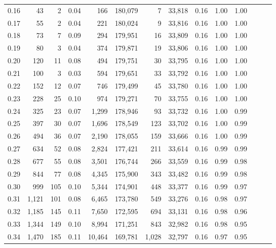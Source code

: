 \begin{tabular}{rrrrrrrrrrrrrr}
0.16 &     43 &      2 &  0.04 &      166 &  180,079 &       7 &  33,818 &  0.16 &  1.00 &      1.00 \\
0.17 &     55 &      2 &  0.04 &      221 &  180,024 &       9 &  33,816 &  0.16 &  1.00 &      1.00 \\
0.18 &     73 &      7 &  0.09 &      294 &  179,951 &      16 &  33,809 &  0.16 &  1.00 &      1.00 \\
0.19 &     80 &      3 &  0.04 &      374 &  179,871 &      19 &  33,806 &  0.16 &  1.00 &      1.00 \\
0.20 &    120 &     11 &  0.08 &      494 &  179,751 &      30 &  33,795 &  0.16 &  1.00 &      1.00 \\
0.21 &    100 &      3 &  0.03 &      594 &  179,651 &      33 &  33,792 &  0.16 &  1.00 &      1.00 \\
0.22 &    152 &     12 &  0.07 &      746 &  179,499 &      45 &  33,780 &  0.16 &  1.00 &      1.00 \\
0.23 &    228 &     25 &  0.10 &      974 &  179,271 &      70 &  33,755 &  0.16 &  1.00 &      1.00 \\
0.24 &    325 &     23 &  0.07 &    1,299 &  178,946 &      93 &  33,732 &  0.16 &  1.00 &      0.99 \\
0.25 &    397 &     30 &  0.07 &    1,696 &  178,549 &     123 &  33,702 &  0.16 &  1.00 &      0.99 \\
0.26 &    494 &     36 &  0.07 &    2,190 &  178,055 &     159 &  33,666 &  0.16 &  1.00 &      0.99 \\
0.27 &    634 &     52 &  0.08 &    2,824 &  177,421 &     211 &  33,614 &  0.16 &  0.99 &      0.99 \\
0.28 &    677 &     55 &  0.08 &    3,501 &  176,744 &     266 &  33,559 &  0.16 &  0.99 &      0.98 \\
0.29 &    844 &     77 &  0.08 &    4,345 &  175,900 &     343 &  33,482 &  0.16 &  0.99 &      0.98 \\
0.30 &    999 &    105 &  0.10 &    5,344 &  174,901 &     448 &  33,377 &  0.16 &  0.99 &      0.97 \\
0.31 &  1,121 &    101 &  0.08 &    6,465 &  173,780 &     549 &  33,276 &  0.16 &  0.98 &      0.97 \\
0.32 &  1,185 &    145 &  0.11 &    7,650 &  172,595 &     694 &  33,131 &  0.16 &  0.98 &      0.96 \\
0.33 &  1,344 &    149 &  0.10 &    8,994 &  171,251 &     843 &  32,982 &  0.16 &  0.98 &      0.95 \\
0.34 &  1,470 &    185 &  0.11 &   10,464 &  169,781 &   1,028 &  32,797 &  0.16 &  0.97 &      0.95 \\

\end{tabular}

